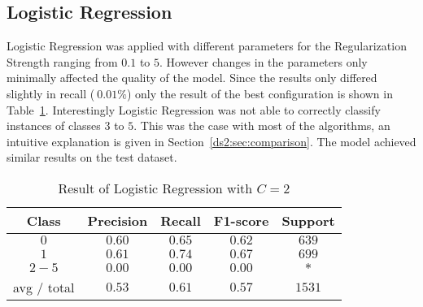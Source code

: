 \subsection{Logistic Regression}
Logistic Regression was applied with different parameters for the Regularization Strength ranging from $0.1$ to $5$. However changes in the parameters only minimally affected the quality of the model. Since the results only differed slightly in recall ($~0.01\%$) only the result of the best configuration is shown in Table~\ref{ds2:table:lr}. Interestingly Logistic Regression was not able to correctly classify instances of classes $3$ to $5$. This was the case with most of the algorithms, an intuitive explanation is given in Section~\ref{ds2:sec:comparison}. The model achieved similar results on the test dataset.

\begin{table}[p]
\begin{center}
\begin{tabular}{|c|c|c|c|c|}
\hline Class & Precision & Recall & F1-score & Support \\
\hline  $0$    &   $0.60$    & $ 0.65$  &   $ 0.62$  &     $639$ \\
\hline  $1$    &   $0.61$    &  $0.74$  &   $ 0.67$  &     $699$ \\
\hline  $2-5$  &   $0.00$    &  $0.00$  &    $0.00$  &     $*$ \\
\hline avg / total &      $0.53$  &    $0.61$  &    $0.57$  &   $1531$\\
\hline
\end{tabular}

\caption{Result of Logistic Regression with $C=2$}
\label{ds2:table:lr}
\end{center}
\end{table}


